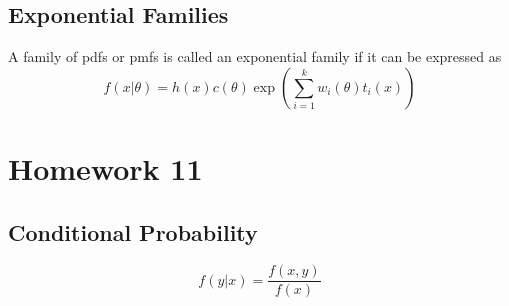 \documentclass{article}
\begin{document}
\begin{flushleft}
\subsection*{Exponential Families}
A family of pdfs or pmfs is called an exponential family if it can be expressed as
\[f(x|\theta)=h(x)c(\theta)\exp\left(\sum_{i=1}^{k}w_i(\theta)t_i(x)\right)
\]
\section*{Homework 11}
\subsection*{Conditional Probability}
\[f(y|x)=\dfrac{f(x,y)}{f(x)}
\]
\end{flushleft}
\end{document}
